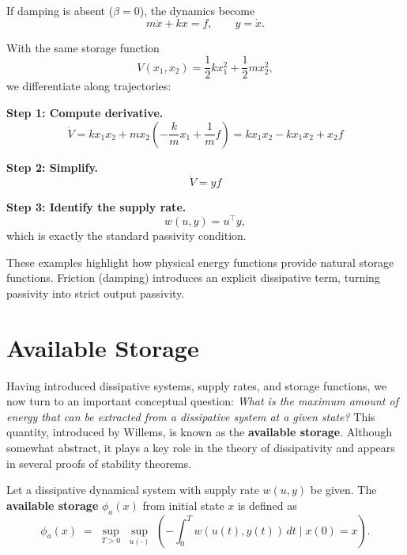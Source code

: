 \begin{example}
If damping is absent ($\beta = 0$), the dynamics become
\begin{equation}
m \ddot{x} + kx = f,
\qquad y = \dot{x}.
\end{equation}

With the same storage function
\begin{equation}
V(x_1,x_2) = \frac{1}{2} k x_1^2 + \frac{1}{2} m x_2^2,
\end{equation}
we differentiate along trajectories:

\textbf{Step 1: Compute derivative.}  
\begin{equation}
\dot{V} = k x_1 x_2 + m x_2 \left(-\frac{k}{m} x_1 + \frac{1}{m} f \right)
= k x_1 x_2 - k x_1 x_2 + x_2 f
\end{equation}

\textbf{Step 2: Simplify.}  
\begin{equation}
\dot{V} = y f
\end{equation}

\textbf{Step 3: Identify the supply rate.}  
\begin{equation}
w(u,y) = u^\top y,
\end{equation}
which is exactly the standard passivity condition.

\end{example}

\begin{remark}
These examples highlight how physical energy functions provide natural storage functions.  
Friction (damping) introduces an explicit dissipative term, turning passivity into 
strict output passivity.
\end{remark}

\section{Available Storage}

Having introduced dissipative systems, supply rates, and storage functions, we now turn 
to an important conceptual question: \emph{What is the maximum amount of energy that 
can be extracted from a dissipative system at a given state?}  
This quantity, introduced by Willems, is known as the \textbf{available storage}.  
Although somewhat abstract, it plays a key role in the theory of dissipativity and 
appears in several proofs of stability theorems.

\begin{definition}\label{def:available_storage}
Let a dissipative dynamical system with supply rate $w(u,y)$ be given.  
The \textbf{available storage} $\phi_a(x)$ from initial state $x$ is defined as
\begin{equation}\label{eq:available_storage}
\phi_a(x) \;=\; \sup_{T>0} \; \sup_{u(\cdot)} \; 
\left( - \int_0^T w(u(t), y(t)) \, dt \;\Big|\; x(0) = x \right).
\end{equation}
\end{definition}

